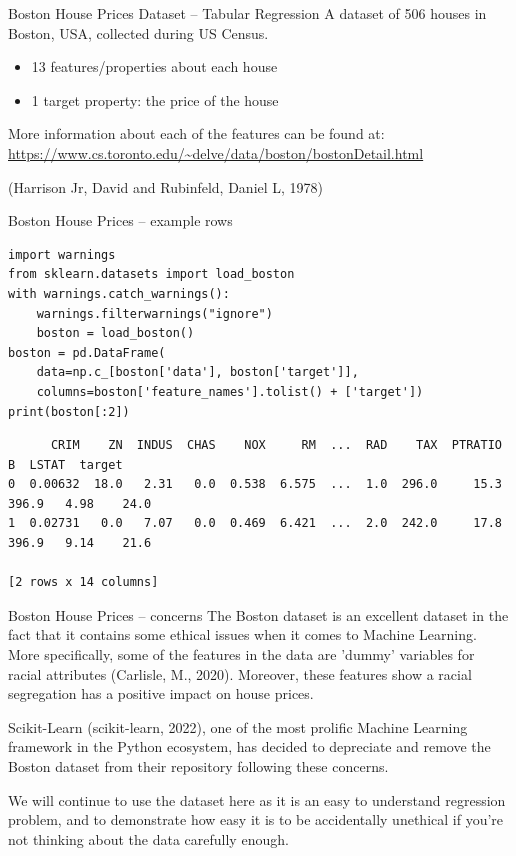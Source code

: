 \documentclass[10pt]{beamer}
\begin{document}
\begin{frame}[label={sec:org8175397}]{Boston House Prices Dataset -- Tabular Regression}
A dataset of 506 houses in Boston, USA, collected during US Census.

\begin{itemize}
\item 13 features/properties about each house
\item 1 target property: the price of the house
\end{itemize}

More information about each of the features can be found at: \url{https://www.cs.toronto.edu/\~delve/data/boston/bostonDetail.html}

(Harrison Jr, David and Rubinfeld, Daniel L, 1978)
\end{frame}

\begin{frame}[label={sec:orgefb60e1},fragile]{Boston House Prices -- example rows}
 \begin{verbatim}
import warnings
from sklearn.datasets import load_boston
with warnings.catch_warnings():
    warnings.filterwarnings("ignore")
    boston = load_boston()
boston = pd.DataFrame(
    data=np.c_[boston['data'], boston['target']],
    columns=boston['feature_names'].tolist() + ['target'])
print(boston[:2])
\end{verbatim}

\begin{verbatim}
      CRIM    ZN  INDUS  CHAS    NOX     RM  ...  RAD    TAX  PTRATIO      B  LSTAT  target
0  0.00632  18.0   2.31   0.0  0.538  6.575  ...  1.0  296.0     15.3  396.9   4.98    24.0
1  0.02731   0.0   7.07   0.0  0.469  6.421  ...  2.0  242.0     17.8  396.9   9.14    21.6

[2 rows x 14 columns]
\end{verbatim}
\end{frame}

\begin{frame}[label={sec:org6d62e8b}]{Boston House Prices -- concerns}
The Boston dataset is an excellent dataset in the fact that it contains some ethical
issues when it comes to Machine Learning. More specifically, some of the features in
the data are 'dummy' variables for racial attributes (Carlisle, M., 2020). Moreover, these features show a
racial segregation has a positive impact on house prices.

Scikit-Learn (scikit-learn, 2022), one of the most prolific Machine Learning framework in the Python
ecosystem, has decided to depreciate and remove the Boston dataset from their
repository following these concerns.

We will continue to use the dataset here as it is an easy to understand regression
problem, and to demonstrate how easy it is to be accidentally unethical if you're not
thinking about the data carefully enough. 
\end{frame}
\end{document}
